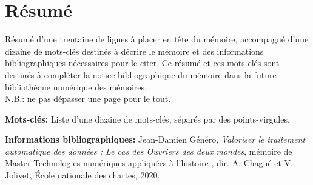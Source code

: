 \section*{Résumé}

 Résumé d'une trentaine de lignes à placer en tête du mémoire, accompagné d'une dizaine de mots-clés destinés à décrire le mémoire et des informations bibliographiques nécessaires pour le citer. Ce résumé et ces mots-clés sont destinés à compléter la notice bibliographique du mémoire dans la future bibliothèque numérique des mémoires.\\
N.B.: ne pas dépasser une page pour le tout.

\medskip

\textbf{Mots-clés:} Liste d'une dizaine de mots-clés, séparés par des points-virgules.

\textbf{Informations bibliographiques:} Jean-Damien Généro, \textit{Valoriser le traitement automatique des données : Le cas des Ouvriers des deux mondes}, mémoire de Master \og Technologies numériques appliquées à l'histoire \fg{}, dir. A. Chagué et V. Jolivet, École nationale des chartes, 2020.